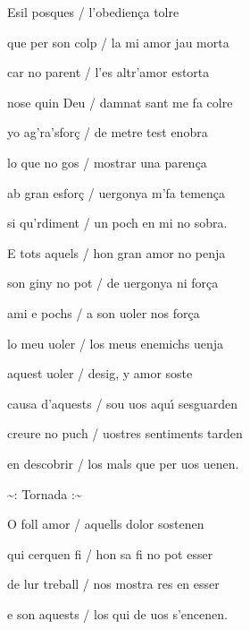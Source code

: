 \documentclass[12pt]{article}
\begin{document}
\begin{estrofa}

 Esil posques / l'obedien\c{c}a tolre

 que per son colp / la mi amor jau morta

 car no parent / l'es altr'amor estorta

 nose quin Deu / damnat sant me fa colre

 yo ag'ra'sfor\c{c} / de metre test enobra

 lo que no gos / mostrar una paren\c{c}a

 ab gran esfor\c{c} / uergonya m'fa temen\c{c}a

 si qu'rdiment / un poch en mi no sobra.

\end{estrofa}



\begin{estrofa}

 E tots aquels / hon gran amor no penja

 son giny no pot / de uergonya ni for\c{c}a

 ami e pochs / a son uoler nos for\c{c}a

 lo meu uoler / los meus enemichs uenja

 aquest uoler / desig, y amor soste

 causa d'aquests / sou uos aqu\'{\i} sesguarden

 creure no puch / uostres sentiments tarden

 en descobrir / los mals que per uos uenen.

\end{estrofa}


\begin{estrofaExtra}%




\begin{tornada}

\pagina{[105v]} \textasciitilde{}: Tornada :\textasciitilde{}

\end{tornada}


\end{estrofaExtra}


\begin{estrofa}

 O foll amor / aquells dolor sostenen

 qui cerquen fi / hon sa fi no pot esser

 de lur treball / nos mostra res en esser

 e son aquests / los qui de uos s'encenen.

\end{estrofa}
\end{document}
